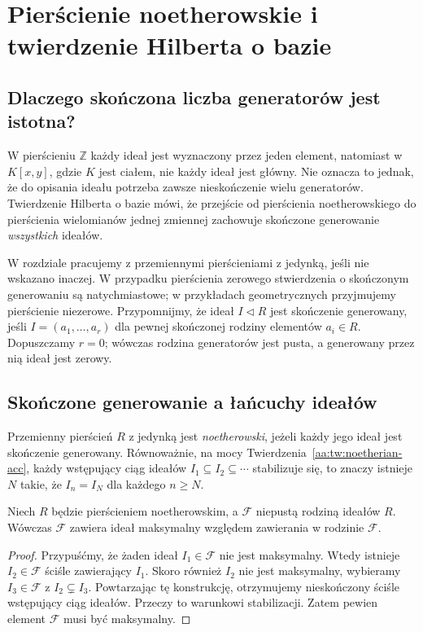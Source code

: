 \chapter[Pierścienie noetherowskie]{Pierścienie noetherowskie i twierdzenie Hilberta o bazie}
\label{aa:ch:noether-hilbert}

\providecommand{\atlasref}[2]{#2}

\section{Dlaczego skończona liczba generatorów jest istotna?}
W pierścieniu $\mathbb Z$ każdy ideał jest wyznaczony przez
jeden element, natomiast w $K[x,y]$, gdzie $K$ jest ciałem,
nie każdy ideał jest główny.
Nie oznacza to jednak, że do opisania ideału potrzeba zawsze
nieskończenie wielu generatorów. Twierdzenie Hilberta o bazie
mówi, że przejście od pierścienia noetherowskiego do pierścienia
wielomianów jednej zmiennej zachowuje skończone generowanie
\emph{wszystkich} ideałów.

W rozdziale pracujemy z przemiennymi pierścieniami z jedynką,
jeśli nie wskazano inaczej. W przypadku pierścienia zerowego
stwierdzenia o skończonym generowaniu są natychmiastowe;
w przykładach geometrycznych przyjmujemy pierścienie niezerowe.
Przypomnijmy, że ideał
$I\triangleleft R$ jest skończenie generowany, jeśli
$I=(a_1,\ldots,a_r)$ dla pewnej skończonej rodziny elementów
$a_i\in R$. Dopuszczamy $r=0$; wówczas rodzina generatorów jest pusta,
a generowany przez nią ideał jest zerowy.

\section{Skończone generowanie a łańcuchy ideałów}
\begin{definicja}
\label{aa:def:noether-full}
Przemienny pierścień $R$ z jedynką jest \emph{noetherowski},
jeżeli każdy jego ideał jest skończenie generowany.
Równoważnie, na mocy
Twierdzenia~\ref{aa:tw:noetherian-acc},
każdy wstępujący ciąg ideałów
$I_1\subseteq I_2\subseteq\cdots$ stabilizuje się,
to znaczy istnieje $N$ takie, że $I_n=I_N$ dla każdego
$n\ge N$.
\end{definicja}

\begin{lemat}
\label{aa:lem:noether-max-ideal-family}
Niech $R$ będzie pierścieniem noetherowskim, a
$\mathcal F$ niepustą rodziną ideałów $R$.
Wówczas $\mathcal F$ zawiera ideał maksymalny względem
zawierania w rodzinie $\mathcal F$.
\end{lemat}
\begin{proof}
Przypuśćmy, że żaden ideał $I_1\in\mathcal F$ nie jest
maksymalny. Wtedy istnieje $I_2\in\mathcal F$ ściśle
zawierający $I_1$. Skoro również $I_2$ nie jest maksymalny,
wybieramy $I_3\in\mathcal F$ z $I_2\subsetneq I_3$.
Powtarzając tę konstrukcję, otrzymujemy nieskończony
ściśle wstępujący ciąg ideałów. Przeczy to warunkowi
stabilizacji. Zatem pewien element $\mathcal F$ musi
być maksymalny.
\end{proof}

